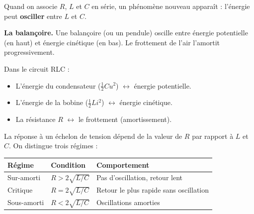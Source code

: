 \documentclass[12pt,a4paper,twoside]{book}
\begin{document}
Quand on associe $R$, $L$ et $C$ en série, un phénomène nouveau apparaît : l'énergie peut \textbf{osciller} entre $L$ et $C$.

\begin{analogie}
\textbf{La balançoire.} Une balançoire (ou un pendule) oscille entre énergie potentielle (en haut) et énergie cinétique (en bas). Le frottement de l'air l'amortit progressivement.

Dans le circuit RLC :
\begin{itemize}[nosep]
\item L'énergie du condensateur ($\frac{1}{2}Cu^2$) $\leftrightarrow$ énergie potentielle.
\item L'énergie de la bobine ($\frac{1}{2}Li^2$) $\leftrightarrow$ énergie cinétique.
\item La résistance $R$ $\leftrightarrow$ le frottement (amortissement).
\end{itemize}
\end{analogie}

La réponse à un échelon de tension dépend de la valeur de $R$ par rapport à $L$ et $C$. On distingue trois régimes :

\begin{center}
\begin{tabular}{lll}
\toprule
\textbf{Régime} & \textbf{Condition} & \textbf{Comportement} \\
\midrule
Sur-amorti & $R > 2\sqrt{L/C}$ & Pas d'oscillation, retour lent \\
Critique & $R = 2\sqrt{L/C}$ & Retour le plus rapide sans oscillation \\
Sous-amorti & $R < 2\sqrt{L/C}$ & Oscillations amorties \\
\bottomrule
\end{tabular}
\end{center}

\begin{center}
\end{center}
\end{document}
